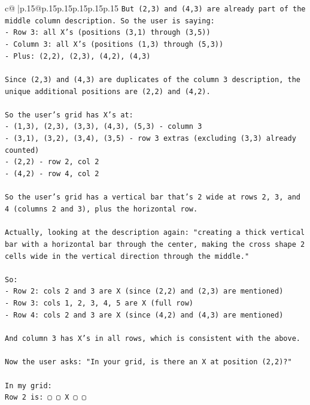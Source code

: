 \documentclass{article}
\begin{document}
{\begin{supertabular}{c@{$\;$}|p{.15\linewidth}@{}p{.15\linewidth}p{.15\linewidth}p{.15\linewidth}p{.15\linewidth}p{.15\linewidth}}
{{{\texttt{But (2,3) and (4,3) are already part of the middle column description. So the user is saying:} \\
\texttt{{-} Row 3: all X's (positions (3,1) through (3,5))} \\
\texttt{{-} Column 3: all X's (positions (1,3) through (5,3))} \\
\texttt{{-} Plus: (2,2), (2,3), (4,2), (4,3)} \\
\\ 
\texttt{Since (2,3) and (4,3) are duplicates of the column 3 description, the unique additional positions are (2,2) and (4,2).} \\
\\ 
\texttt{So the user's grid has X's at:} \\
\texttt{{-} (1,3), (2,3), (3,3), (4,3), (5,3) {-} column 3} \\
\texttt{{-} (3,1), (3,2), (3,4), (3,5) {-} row 3 extras (excluding (3,3) already counted)} \\
\texttt{{-} (2,2) {-} row 2, col 2} \\
\texttt{{-} (4,2) {-} row 4, col 2} \\
\\ 
\texttt{So the user's grid has a vertical bar that's 2 wide at rows 2, 3, and 4 (columns 2 and 3), plus the horizontal row.} \\
\\ 
\texttt{Actually, looking at the description again: "creating a thick vertical bar with a horizontal bar through the center, making the cross shape 2 cells wide in the vertical direction through the middle."} \\
\\ 
\texttt{So:} \\
\texttt{{-} Row 2: cols 2 and 3 are X (since (2,2) and (2,3) are mentioned)} \\
\texttt{{-} Row 3: cols 1, 2, 3, 4, 5 are X (full row)} \\
\texttt{{-} Row 4: cols 2 and 3 are X (since (4,2) and (4,3) are mentioned)} \\
\\ 
\texttt{And column 3 has X's in all rows, which is consistent with the above.} \\
\\ 
\texttt{Now the user asks: "In your grid, is there an X at position (2,2)?"} \\
\\ 
\texttt{In my grid:} \\
\texttt{Row 2 is: ▢ ▢ X ▢ ▢} \\
}}}
\end{supertabular}}
\end{document}
